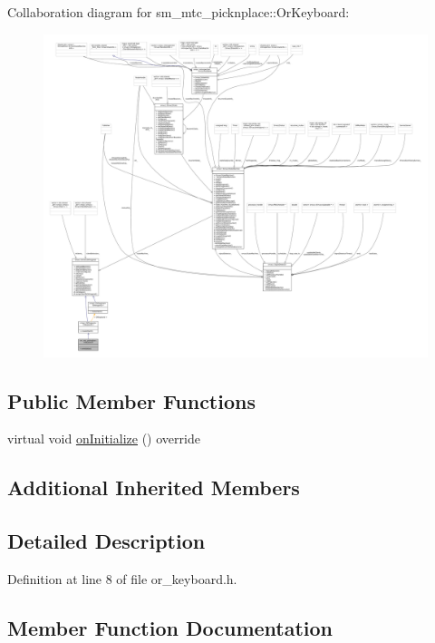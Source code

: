 Collaboration diagram for sm\+\_\+mtc\+\_\+picknplace\+:\+:Or\+Keyboard\+:
\nopagebreak
\begin{figure}[H]
\begin{center}
\leavevmode
\includegraphics[width=350pt]{classsm__mtc__picknplace_1_1OrKeyboard__coll__graph}
\end{center}
\end{figure}
\subsection*{Public Member Functions}
\begin{DoxyCompactItemize}
\item 
virtual void \hyperlink{classsm__mtc__picknplace_1_1OrKeyboard_af1c7edcdc22bb8eecf2abc835c53f05c}{on\+Initialize} () override
\end{DoxyCompactItemize}
\subsection*{Additional Inherited Members}


\subsection{Detailed Description}


Definition at line 8 of file or\+\_\+keyboard.\+h.



\subsection{Member Function Documentation}
